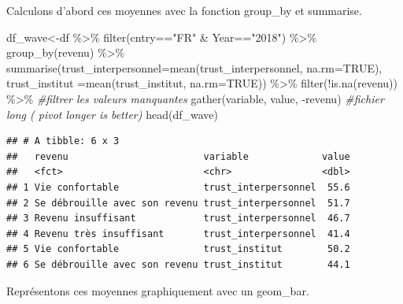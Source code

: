 \documentclass[
]{book}
\newenvironment{Shaded}{\begin{snugshade}}{\end{snugshade}}
\newcommand{\AttributeTok}[1]{\textcolor[rgb]{0.77,0.63,0.00}{#1}}
\newcommand{\CommentTok}[1]{\textcolor[rgb]{0.56,0.35,0.01}{\textit{#1}}}
\newcommand{\ConstantTok}[1]{\textcolor[rgb]{0.00,0.00,0.00}{#1}}
\newcommand{\FunctionTok}[1]{\textcolor[rgb]{0.00,0.00,0.00}{#1}}
\newcommand{\NormalTok}[1]{#1}
\newcommand{\OtherTok}[1]{\textcolor[rgb]{0.56,0.35,0.01}{#1}}
\newcommand{\SpecialCharTok}[1]{\textcolor[rgb]{0.00,0.00,0.00}{#1}}
\newcommand{\StringTok}[1]{\textcolor[rgb]{0.31,0.60,0.02}{#1}}
\begin{document}
Calculons d'abord ces moyennes avec la fonction group\_by et summarise.

\begin{Shaded}
\begin{Highlighting}[]
\NormalTok{df\_wave}\OtherTok{\textless{}{-}}\NormalTok{df }\SpecialCharTok{\%\textgreater{}\%} \FunctionTok{filter}\NormalTok{(cntry}\SpecialCharTok{==}\StringTok{"FR"} \SpecialCharTok{\&}\NormalTok{ Year}\SpecialCharTok{==}\StringTok{"2018"}\NormalTok{) }\SpecialCharTok{\%\textgreater{}\%}
  \FunctionTok{group\_by}\NormalTok{(revenu) }\SpecialCharTok{\%\textgreater{}\%} 
  \FunctionTok{summarise}\NormalTok{(}\AttributeTok{trust\_interpersonnel=}\FunctionTok{mean}\NormalTok{(trust\_interpersonnel, }\AttributeTok{na.rm=}\ConstantTok{TRUE}\NormalTok{),}
            \AttributeTok{trust\_institut =}\FunctionTok{mean}\NormalTok{(trust\_institut, }\AttributeTok{na.rm=}\ConstantTok{TRUE}\NormalTok{)) }\SpecialCharTok{\%\textgreater{}\%}
  \FunctionTok{filter}\NormalTok{(}\SpecialCharTok{!}\FunctionTok{is.na}\NormalTok{(revenu)) }\SpecialCharTok{\%\textgreater{}\%}                                              \CommentTok{\#filtrer les valeurs manquantes}
  \FunctionTok{gather}\NormalTok{(variable, value, }\SpecialCharTok{{-}}\NormalTok{revenu)                                        }\CommentTok{\#fichier long ( pivot longer is better)}
\FunctionTok{head}\NormalTok{(df\_wave)}
\end{Highlighting}
\end{Shaded}

\begin{verbatim}
## # A tibble: 6 x 3
##   revenu                        variable             value
##   <fct>                         <chr>                <dbl>
## 1 Vie confortable               trust_interpersonnel  55.6
## 2 Se débrouille avec son revenu trust_interpersonnel  51.7
## 3 Revenu insuffisant            trust_interpersonnel  46.7
## 4 Revenu très insuffisant       trust_interpersonnel  41.4
## 5 Vie confortable               trust_institut        50.2
## 6 Se débrouille avec son revenu trust_institut        44.1
\end{verbatim}

Représentons ces moyennes graphiquement avec un geom\_bar.
\end{document}

